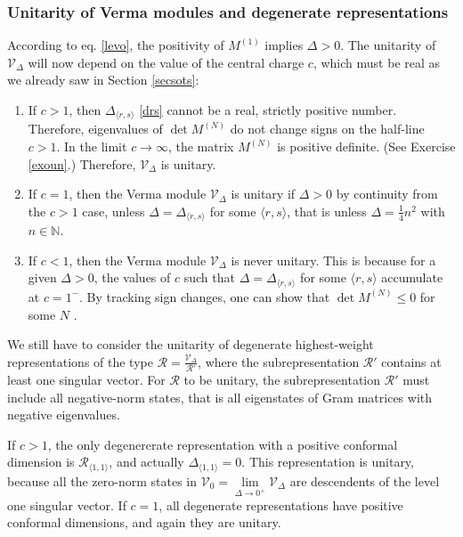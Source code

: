 \documentclass[12pt, a4paper, notitlepage, twoside]{report}
\numberwithin{equation}{section}
\theoremstyle{break}
\begin{document}
\subsubsection{Unitarity of Verma modules and degenerate representations}

According to eq. \eqref{levo}, the positivity of $M^{(1)}$ implies $\Delta >0$. 
The unitarity of $\mathcal{V}_\Delta$ will now depend on the value of the central charge $c$, which must be real 
as we already saw in Section \ref{secsots}:
\begin{enumerate}
 \item 
If $c > 1$, then $\Delta_{\langle r,s \rangle}$ \eqref{drs} cannot be a real, strictly positive number. 
Therefore, eigenvalues of $\det M^{(N)}$ do not change signs on the half-line $c > 1$.
In the limit $c \to \infty$, the matrix $M^{(N)}$ is positive definite. (See Exercise \ref{exoun}.) 
Therefore, $\mathcal{V}_\Delta$ is unitary. 
\item 
If $c=1$, then the Verma module $\mathcal{V}_\Delta$ is unitary if $\Delta > 0$ by continuity from the $c>1$ case, unless $\Delta=\Delta_{\langle r,s \rangle}$ for some $\langle r,s \rangle$, that is unless $\Delta =\frac14 n^2$ with $n\in {\mathbb{N}}$.
\item 
If $c<1$, then the Verma module $\mathcal{V}_\Delta$ is never unitary. 
This is because for a given $\Delta>0$, the values of $c$ such that $\Delta = \Delta_{\langle r,s \rangle}$ for some $\langle r,s \rangle$ accumulate at $c=1^-$. By tracking sign changes, one can show that $\det M^{(N)}\leq 0$ for some $N$ \cite{fms97}. 
\end{enumerate}

We still have to consider the unitarity of degenerate highest-weight representations of the type $\mathcal{R}=\frac{\mathcal{V}_\Delta}{\mathcal{R}'}$, where the subrepresentation $\mathcal{R}'$ contains at least one singular vector. 
For $\mathcal{R}$ to be unitary, the subrepresentation $\mathcal{R}'$ must include all negative-norm states, that is all eigenstates of Gram matrices with negative eigenvalues.

If $c > 1$, the only degenererate representation with a positive conformal dimension is $\mathcal{R}_{\langle 1,1 \rangle}$, and actually $\Delta_{\langle 1,1 \rangle}=0$. This representation is unitary, because all the zero-norm states in $\mathcal{V}_0 = \underset{\Delta \to 0^+}{\lim} \mathcal{V}_\Delta$ are descendents of the level one singular vector. If $c=1$, all degenerate representations have positive conformal dimensions, and again they are unitary.
\end{document}
